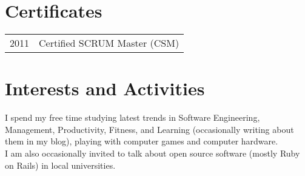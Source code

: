 \documentclass[a4paper,10pt]{article}
\begin{document}
\section{Certificates}
\begin{tabular}{rl}
 2011 & Certified SCRUM Master (\textsc{CSM}) \\
\end{tabular}

\section{Interests and Activities}
I spend my free time studying latest trends in Software Engineering, Management, Productivity, Fitness, and Learning (occasionally writing about them in my blog), playing with computer games and computer hardware. \\
I am also occasionally invited to talk about open source software (mostly Ruby on Rails) in local universities.
\end{document}
